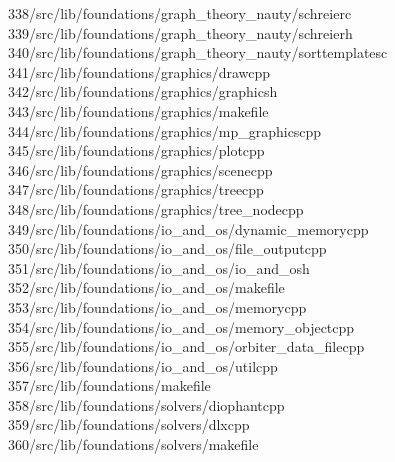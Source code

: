 \begin{tabbing}
338\>/src/lib/foundations/graph\_theory\_nauty/schreierc\\[0pt]
339\>/src/lib/foundations/graph\_theory\_nauty/schreierh\\[0pt]
340\>/src/lib/foundations/graph\_theory\_nauty/sorttemplatesc\\[0pt]
341\>/src/lib/foundations/graphics/drawcpp\\[0pt]
342\>/src/lib/foundations/graphics/graphicsh\\[0pt]
343\>/src/lib/foundations/graphics/makefile\\[0pt]
344\>/src/lib/foundations/graphics/mp\_graphicscpp\\[0pt]
345\>/src/lib/foundations/graphics/plotcpp\\[0pt]
346\>/src/lib/foundations/graphics/scenecpp\\[0pt]
347\>/src/lib/foundations/graphics/treecpp\\[0pt]
348\>/src/lib/foundations/graphics/tree\_nodecpp\\[0pt]
349\>/src/lib/foundations/io\_and\_os/dynamic\_memorycpp\\[0pt]
350\>/src/lib/foundations/io\_and\_os/file\_outputcpp\\[0pt]
351\>/src/lib/foundations/io\_and\_os/io\_and\_osh\\[0pt]
352\>/src/lib/foundations/io\_and\_os/makefile\\[0pt]
353\>/src/lib/foundations/io\_and\_os/memorycpp\\[0pt]
354\>/src/lib/foundations/io\_and\_os/memory\_objectcpp\\[0pt]
355\>/src/lib/foundations/io\_and\_os/orbiter\_data\_filecpp\\[0pt]
356\>/src/lib/foundations/io\_and\_os/utilcpp\\[0pt]
357\>/src/lib/foundations/makefile\\[0pt]
358\>/src/lib/foundations/solvers/diophantcpp\\[0pt]
359\>/src/lib/foundations/solvers/dlxcpp\\[0pt]
360\>/src/lib/foundations/solvers/makefile\\[0pt]

\end{tabbing}
